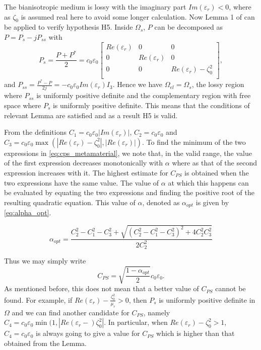 The bianisotropic medium is lossy with the imaginary part $Im(\varepsilon_r) < 0$, 
where as $\zeta_0$ is assumed real here to avoid some longer calculation. 
Now Lemma 1 of \cite{kalarickel2020well} can be applied to verify hypothesis H5.
Inside $\Omega_s$, $P$ can be decomposed as $P= P_s -j P_{ss}$ with
\begin{equation}
P_s = \frac{P+P^*}{2} =  c_0\varepsilon_0
\begin{bmatrix}
Re(\varepsilon_r) & 0 & 0 \\
0 & Re(\varepsilon_r) & 0 \\
0 & 0 & Re(\varepsilon_r) - \zeta_0^2 \\
\end{bmatrix},
\end{equation}
and  $P_{ss} = \frac{P^*-P}{2j} =  -c_0\varepsilon_0 Im(\varepsilon_r) I_3$.
Hence we have $\Omega_{el} = \Omega_s$, the lossy region 
where $P_{ss}$ is uniformly positive definite 
and the complementary region with free space where $P_s$ 
is uniformly positive definite.
This means that the conditions of relevant Lemma are satisfied and 
as a result H5 is valid.

From the definitions
$C_1=c_0\varepsilon_0 |Im(\varepsilon_r)|$, 
$C_2 = c_0\varepsilon_0$ and 
$C_3 = c_0\varepsilon_0 \max(|Re(\varepsilon_r) -\zeta_0^2|, |Re(\varepsilon_r)|)$.
To find the minimum of the two expressions in \eqref{eq:cps_metamaterial},
we note that, in the valid range, the value of the 
first expression decreases monotonically with  $\alpha$ where as
that of the second expression increases with it. 
The highest estimate for $C_{PS}$  is obtained when the two expressions 
have the same value.
The value of $\alpha$ at which this happens can be evaluated by 
equating the two expressions and finding the positive 
root of the resulting quadratic equation.
This value of $\alpha$, denoted as $\alpha_{opt}$ is given by 
\eqref{eq:alpha_opt}.

\begin{equation}  \label{eq:alpha_opt}
\alpha_{opt} = \frac{C_2^2-C_1^2-C_3^2 + \sqrt{(C_2^2-C_1^2-C_3^2)^2+4C_2^2C_3^2}}{2C_2^2}
\end{equation}

Thus we may simply write 
\begin{equation} \label{eq:cps_metamaterial_optimal}
C_{PS} = \sqrt{\frac{1-\alpha_{opt}}{2}}c_0\varepsilon_0.
\end{equation}
As mentioned before, this does not mean that a better value of $C_{PS}$ 
cannot be found.
For example, if $Re(\varepsilon_r) -\frac{\zeta_0^2}{\mu_r} > 0$, 
then $P_s$ is uniformly positive definite in $\Omega$ and we can find 
another candidate for $C_{PS}$, namely $C_4 = c_0\varepsilon_0\min(1, |Re(\varepsilon_r-)\zeta_0^2|$.
In particular, when  $Re(\varepsilon_r) - \zeta_0^2 > 1$, $C_4 = c_0\varepsilon_0$ is always going to give a value for $C_{PS}$ which is higher than that obtained from the Lemma.

